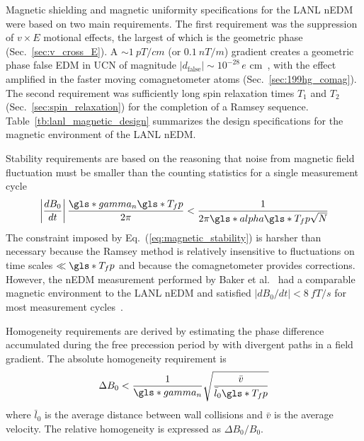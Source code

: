 Magnetic shielding and magnetic uniformity specifications for the LANL nEDM were based on two main requirements. The first requirement was the suppression of $v\times E$ motional effects, the largest of which is the geometric phase (Sec.~\ref{sec:v_cross_E}). A $\sim\qty{1}{pT\per cm}$ (or $\qty{0.1}{nT\per m}$) gradient creates a geometric phase false EDM in UCN of magnitude $|d_\text{false}|\sim 10^{-28}\,e\text{ cm}$~\cite{lamoreaux_geometric_phase_2005}, with the effect amplified in the faster moving \hg comagnetometer atoms (Sec.~\ref{sec:199hg_comag}). The second requirement was sufficiently long spin relaxation times $T_1$ and $T_2$ (Sec.~\ref{sec:spin_relaxation}) for the completion of a Ramsey sequence. Table~\ref{tb:lanl_magnetic_design} summarizes the design specifications for the magnetic environment of the LANL nEDM.

Stability requirements are based on the reasoning that noise from magnetic field fluctuation must be smaller than the counting statistics for a single measurement cycle~\cite{baker_apparatus_2014}
%
\begin{gather}
    \left| \frac{dB_0}{dt}\right| \frac{\gls*{gamma_n}\gls*{T_fp}}{2\pi} < \frac{1}{2\pi\gls*{alpha}\gls*{T_fp}\sqrt{N}} \label{eq:magnetic_stability}
\end{gather}
%
The constraint imposed by Eq.~(\ref{eq:magnetic_stability}) is harsher than necessary because the Ramsey method is relatively insensitive to fluctuations on time scales $\ll \gls*{T_fp}$ and because the \hg comagnetometer provides corrections. However, the nEDM measurement performed by Baker et al.~\cite{BAK06} had a comparable magnetic environment to the LANL nEDM and satisfied $|dB_0/dt|<\qty{8}{fT\per s}$ for most measurement cycles~\cite{baker_apparatus_2014}.

Homogeneity requirements are derived by estimating the phase difference accumulated during the free precession period by \ucn with divergent paths in a field gradient. The absolute homogeneity requirement is ~\cite{baker_apparatus_2014}
%
\begin{gather}
    \Delta B_0 < \frac{1}{\gls*{gamma_n}}\sqrt{\frac{\bar{v}}{\bar{l}_0 \gls*{T_fp}}}
\end{gather}
%
where $\bar{l}_0$ is the average distance between wall collisions and $\bar{v}$ is the average \ucn velocity. The relative homogeneity is expressed as $\Delta B_0/B_0$.

